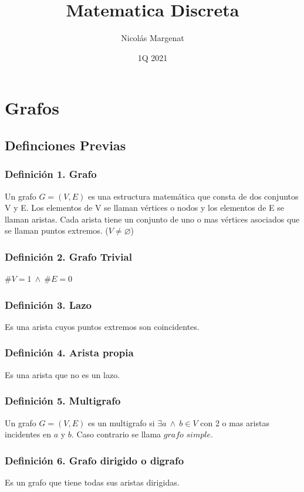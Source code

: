 \documentclass{article}
\title{Matematica Discreta}
\author{Nicolás Margenat}
\date{1Q 2021}
\newcommand{\lands}{\:\land\:}                          %
\begin{document}
\maketitle
\tableofcontents

\newpage
\section{Grafos}
\subsection{Definciones Previas}
\subsubsection*{Definición 1. Grafo}
Un grafo $G=(V,E)$ es una estructura matemática que consta de dos conjuntos V y E.
Los elementos de V se llaman vértices o nodos y los elementos de E se llaman aristas.
Cada arista tiene un conjunto de uno o mas vértices asociados que se llaman puntos extremos.
($V \neq \varnothing$)

\subsubsection*{Definición 2. Grafo Trivial}
$\#V=1 \lands \#E=0$

\subsubsection*{Definición 3. Lazo}
Es una arista cuyos puntos extremos son coincidentes.

\subsubsection*{Definición 4. Arista propia}
Es una arista que no es un lazo.

\subsubsection*{Definición 5. Multigrafo}
Un grafo $G=(V,E)$ es un multigrafo si $\exists a \lands b \in V$ con 2 o mas aristas incidentes en $a$ y $b$. 
Caso contrario se llama $grafo$ $simple$.

\subsubsection*{Definición 6. Grafo dirigido o digrafo}
Es un grafo que tiene todas sus aristas dirigidas.
\end{document}
